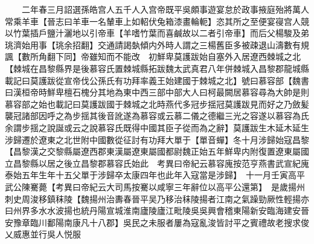 　　二年春三月詔選孫皓宫人五千人入宫帝既平吳頗事遊宴怠於政事掖庭殆將萬人常乘羊車【晉志曰羊車一名輦車上如軺伏兔箱漆畫輪軛】恣其所之至便宴寑宫人競以竹葉插戶鹽汁灑地以引帝車【羊嗜竹葉而喜鹹故以二者引帝車】而后父楊駿及弟珧濟始用事【珧余招翻】交通請謁埶傾内外時人謂之三楊舊臣多被疎退山濤數有規諷【數所角翻下同】帝雖知而不能改　初鮮卑莫護跋始自塞外入居遼西棘城之北【棘城在昌黎縣界是後慕容氏置棘城縣拓跋魏太武真君八年併棘城入昌黎郡龍城縣載記曰莫護跋從宣帝伐公孫氏有功拜率義王始建國于棘城之北】號曰慕容部【魏書曰漢桓帝時鮮卑檀石槐分其地為東中西三部中部大人曰柯最闕居慕容尋為大帥是則慕容部之始也載記曰莫護跋國于棘城之北時燕代多冠步揺冠莫護跋見而好之乃斂髪襲冠諸部因呼之為步揺其後音訛遂為慕容或云慕二儀之德繼三光之容遂以慕容為氏余謂步揺之說誕或云之說慕容氏既得中國其臣子從而為之辭】莫護跋生木延木延生涉歸遷於遼東之北世附中國數從征討有功拜大單于【單音蟬】冬十月涉歸始寇昌黎【昌黎漢之交黎縣屬遼西郡東漢屬遼東屬國都尉魏正始五年鮮卑内附復置遼東屬國立昌黎縣以居之後立昌黎郡慕容氏始此　考異曰帝紀云慕容廆按范亨燕書武宣紀廆泰始五年生年十五父單于涉歸卒太康四年也此年入寇當是涉歸】　十一月壬寅高平武公陳騫薨【考異曰帝紀云大司馬按騫以咸寧三年辭位以高平公還第】　是歲揚州刺史周浚移鎮秣陵【魏揚州治夀春晉平吴乃移治秣陵揚者江南之氣躁勁厥性輕揚亦曰州界多水水波揚也統丹陽宣城淮南廬陵廬江毗陵吳吳興會稽東陽新安臨海建安晉安豫章臨川鄱陽南康凡十八郡】吳民之未服者屢為寇亂浚皆討平之賓禮故老搜求俊乂威惠並行吳人悦服

